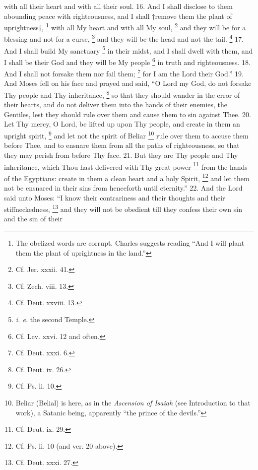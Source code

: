 with all their heart and with all their soul. 16. And I shall disclose to them abounding peace with righteousness, and I shall †remove them the plant of uprightness†, \footnote{The obelized words are corrupt. Charles suggests reading ``And I will plant them the plant of uprightness in the land.''} with all My heart and with all My soul, \footnote{Cf. Jer. xxxii. 41.} and they will be for a blessing and not for a curse, \footnote{Cf. Zech. viii. 13.} and they will be the head and not the tail. \footnote{Cf. Deut. xxviii. 13.} 17. And I shall build My sanctuary \footnote{\emph{i. e.} the second Temple.} in their midst, and I shall dwell with them, and I shall be their God and they will be My people \footnote{Cf. Lev. xxvi. 12 and often.} in truth and righteousness. 18. And I shall not forsake them nor fail them; \footnote{Cf. Deut. xxxi. 6.} for I am the Lord their God.'' 19. And Moses fell on his face and prayed and said, ``O Lord my God, do not forsake Thy people and Thy inheritance, \footnote{Cf. Deut. ix. 26.} so that they should wander in the error of their hearts, and do not deliver them into the hands of their enemies, the Gentiles, lest they should rule over them and cause them to sin against Thee. 20. Let Thy mercy, O Lord, be lifted up upon Thy people, and create in them an upright spirit, \footnote{Cf. Ps. li. 10.} and let not the spirit of Beliar \footnote{Beliar (Belial) is here, as in the \emph{Ascension of Isaiah} (see Introduction to that work), a Satanic being, apparently ``the prince of the devils.''} rule over them to accuse them before Thee, and to ensnare them from all the paths of righteousness, so that they may perish from before Thy face. 21. But they are Thy people and Thy inheritance, which Thou hast delivered with Thy great power \footnote{Cf. Deut. ix. 29.} from the hands of the Egyptians: create in them a clean heart and a holy Spirit, \footnote{Cf. Ps. li. 10 (and ver. 20 above).} and let them not be ensnared in their sins from henceforth until eternity.'' 22. And the Lord said unto Moses: ``I know their contrariness and their thoughts and their stiffneckedness, \footnote{Cf. Deut. xxxi. 27.} and they will not be obedient till they confess their own sin and the sin of their

